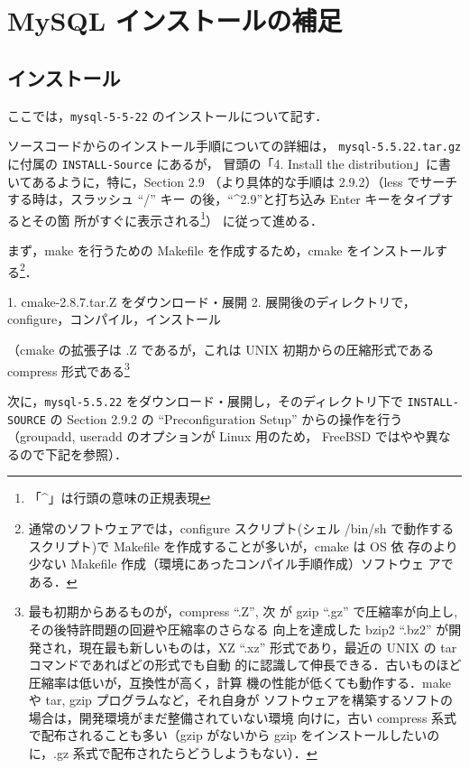 \section{MySQL インストールの補足}

\subsection{インストール}

ここでは，\texttt{mysql-5-5-22} のインストールについて記す．

ソースコードからのインストール手順についての詳細は，
\texttt{mysql-5.5.22.tar.gz} に付属の \texttt{INSTALL-Source} にあるが，
冒頭の「4. Install the distribution」に書いてあるように，特に，Section
2.9 （より具体的な手順は 2.9.2）（less でサーチする時は，スラッシュ ``/'' キー
の後，``\textasciicircum 2.9''と打ち込み Enter キーをタイプするとその箇
所がすぐに表示される\footnote{「\textasciicircum」は行頭の意味の正規表現}）
に従って進める．

まず，make を行うための Makefile を作成するため，cmake をインストールす
る\footnote{通常のソフトウェアでは，configure スクリプト(シェル /bin/sh
で動作するスクリプト)で Makefile を作成することが多いが，cmake は OS 依
存のより少ない Makefile 作成（環境にあったコンパイル手順作成）ソフトウェ
アである．}．

\begin{cli}
1. cmake-2.8.7.tar.Z をダウンロード・展開
2. 展開後のディレクトリで，configure，コンパイル，インストール
\end{cli}
（cmake の拡張子は .Z であるが，これは UNIX 初期からの圧縮形式である
compress 形式である\footnote{最も初期からあるものが，compress ``.Z'', 次
が gzip ``.gz'' で圧縮率が向上し, その後特許問題の回避や圧縮率のさらなる
向上を達成した bzip2 ``.bz2'' が開発され，現在最も新しいものは，XZ
``.xz'' 形式であり，最近の UNIX の tar コマンドであればどの形式でも自動
的に認識して伸長できる．古いものほど圧縮率は低いが，互換性が高く，計算
機の性能が低くても動作する．make や tar, gzip プログラムなど，それ自身が
ソフトウェアを構築するソフトの場合は，開発環境がまだ整備されていない環境
向けに，古い compress 系式で配布されることも多い（gzip がないから gzip 
をインストールしたいのに，.gz 系式で配布されたらどうしようもない）．}

次に，\texttt{mysql-5.5.22} をダウンロード・展開し，そのディレクトリ下で
\texttt{INSTALL-SOURCE} の Section 2.9.2 の ``Preconfiguration Setup''
からの操作を行う（groupadd, useradd のオプションが Linux 用のため，
FreeBSD ではやや異なるので下記を参照）．

